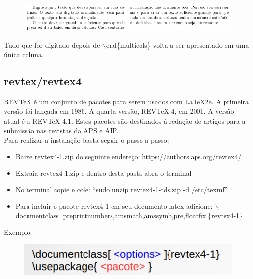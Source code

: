 \documentclass[12pt]{article}
\begin{document}
			\begin{figure}[h]
				\centering
				\includegraphics[scale=0.7]{exp.png}
			\end{figure}
			Tudo que for digitado depois de $\backslash$end\{{multicols}\} volta a ser apresentado em uma única coluna.
		
		\subsection{revtex/revtex4}
			REVTeX é um conjunto de pacotes para serem usados com LaTeX2e. A primeira versão foi lançada em 1986. A quarta versão, REVTeX 4, em 2001. A
			versão atual é a REVTeX 4.1. Estes pacotes são destinados à redação de artigos para a submissão
			nas revistas da APS e AIP.\\
			Para realizar a instalação basta seguir o passo a passo:\\
			\begin{itemize}
			
				\item Baixe revtex4-1.zip do seguinte endereço: https://authors.aps.org/revtex4/
				\item Extraia revtex4-1.zip e dentro desta pasta abra o terminal
				\item No terminal copie e cole:  “sudo unzip revtex4-1-tds.zip -d /etc/texmf”
				\item Para incluir o pacote  revtex4-1 em seu documento latex adicione: $\backslash$documentclass [preprintnumbers,amsmath,amssymb,pre,floatfix]\{{revtex4-1}\}
			
			\end{itemize}
			Exemplo:
			
			\begin{figure}[h]
				\centering
				\includegraphics[scale=0.6]{re.png}
			\end{figure}
		
		
\end{document}

